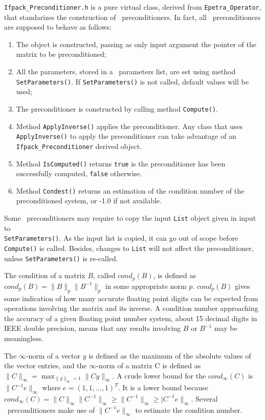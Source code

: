\verb!Ifpack_Preconditioner.h! is a pure virtual class, derived from
\verb!Epetra_Operator!, that standarizes the construction of \ifpack\
preconditioners. In fact, all \ifpack\ preconditioners are supposed to behave
as follows:
\begin{enumerate}
\item The object is constructed, passing as only input argument the
pointer of the matrix to be preconditioned;
\item All the parameters, stored in a \teuchos\ parameters list, are
set using method \verb!SetParameters()!. If \verb!SetParameters()! is not
called, default values will be used;
\item The preconditioner is constructed by calling method \verb!Compute()!.
\item Method \verb!ApplyInverse()! applies the preconditioner. Any class that
uses \verb!ApplyInverse()! to apply the preconditioner can take advantage of
an \verb!Ifpack_Preconditioner! derived object.
\item Method \verb!IsComputed()! returns {\tt true} is the preconditioner has
been successfully computed, {\tt false} otherwise.
\item Method \verb!Condest()! returns an estimation of the condition
number of the preconditioned system, or -1.0 if not available.
\end{enumerate}

\begin{remark}
Some \ifpack\ preconditioners may require to copy the input \verb!List! object
given 
in input to \\ \verb!SetParameters()!. As the input list is copied, it 
can go out of scope before \verb!Compute()! is called. Besides, changes to
\verb!List! will not affect the preconditioner, unless \verb!SetParameters()!
is re-called.
\end{remark}

\begin{remark}
The condition of a matrix $B$, called $cond_p(B)$, is defined as
$cond_p(B) = \|B\|_p\|B^{-1}\|_p$ in some appropriate norm $p$. 
$cond_p(B)$
gives some indication of how many accurate floating point
digits can be expected from operations involving the matrix and its
inverse.  A condition number approaching the accuracy of a given
floating point number system, about 15 decimal digits in IEEE double
precision, means that any results involving $B$ or $B^{-1}$ may be
meaningless.

The $\infty$-norm of a vector $y$ is defined as the maximum of the
absolute values of the vector entries, and the $\infty$-norm of a
matrix C is defined as
$\|C\|_\infty = \max_{\|y\|_\infty = 1} \|Cy\|_\infty$.
A crude lower bound for the $cond_\infty(C)$ is
$\|C^{-1}e\|_\infty$ where $e = (1, 1, \ldots, 1)^T$.  It is a
lower bound because $cond_\infty(C) = \|C\|_\infty\|C^{-1}\|_\infty
\ge \|C^{-1}\|_\infty \ge |C^{-1}e\|_\infty$. Several \ifpack\
  preconditioners make use of
$\|C^{-1}e\|_\infty$ to estimate the condition number.
\end{remark}

